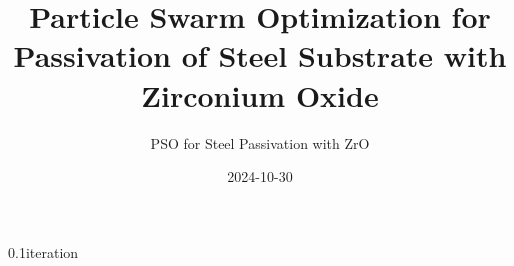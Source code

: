 \documentclass[hyperref={pdfpagelabels=false}, aspectratio=43, t]{beamer}  %
\title{Particle Swarm Optimization for Passivation of Steel Substrate with Zirconium Oxide} %
\subtitle{PSO for Steel Passivation with ZrO}  %
\date{2024-10-30} %
\begin{document}

\maketitle

													



\begin{graphicsFrame}{}{}{0.1}{}{iteration}{}\end{graphicsFrame}

\end{document}
